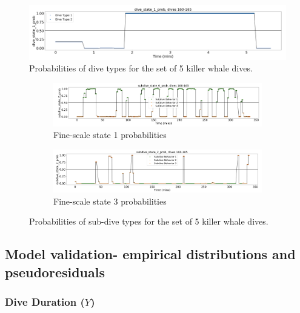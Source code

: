 \documentclass[12pt]{TD-CJS}
\begin{document}
\begin{figure}[ht]
	\centering
	\includegraphics[width=5in]{../Plots/Coarse_state_probs.png}
	\caption{Probabilities of dive types for the set of 5 killer whale dives.}
	\label{fig:coarse_probs}
\end{figure}
%
\begin{figure}[ht]
	\centering
	\begin{subfigure}[t]{1.0\textwidth}
        \centering
        \includegraphics[width=5in]{../Plots/Fine_state_probs_1.png}
        \caption{Fine-scale state 1 probabilities}
    \end{subfigure}
    \newline
    \begin{subfigure}[t]{1.0\textwidth}
        \centering
        \includegraphics[width=5in]{../Plots/Fine_state_probs_3.png}
        \caption{Fine-scale state 3 probabilities}
    \end{subfigure}
	\caption{Probabilities of sub-dive types for the set of 5 killer whale dives.}
	\label{fig:fine_probs}
\end{figure}

\subsection{Model validation- empirical distributions and pseudoresiduals}

\subsubsection{Dive Duration ($Y$)}
\end{document}
